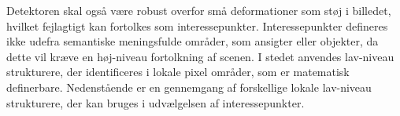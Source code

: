 Detektoren skal også være robust overfor små deformationer som støj i billedet, hvilket fejlagtigt kan fortolkes som interessepunkter. Interessepunkter defineres ikke udefra semantiske meningsfulde områder, som ansigter eller objekter, da dette vil kræve en høj-niveau fortolkning af scenen. I stedet anvendes lav-niveau strukturere, der identificeres i lokale pixel områder, som er matematisk definerbare. Nedenstående er en gennemgang af forskellige lokale lav-niveau strukturere, der kan bruges i udvælgelsen af interessepunkter.


